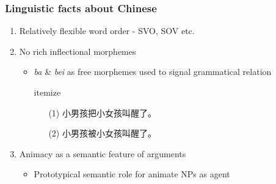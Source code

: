 \documentclass{beamer}
\begin{document}



\begin{frame}
\frametitle{Linguistic facts about Chinese}

\begin{enumerate}
    \pause
   \item Relatively flexible word order - SVO, SOV etc.
   \pause
   \setlength{\parskip}{1em}
   \pause
   \item No rich inflectional morphemes
   \pause
   \begin{itemize}
    \pause
       \item \emph{ba} \& \emph{bei} as free morphemes used to signal grammatical relation
       \vspace{2mm}
       \begin{CJK*}{UTF8}{gbsn}itemize
       
       \begin{itemize}
           \centering
           \item[(1)] 小男孩把小女孩叫醒了。
           \vspace{1mm}
           \item[(2)] 小男孩被小女孩叫醒了。
       \end{itemize}
    
       
       \end{CJK*}
       \pause
   \end{itemize}
   \setlength{\parskip}{1em}
   \pause
   \item Animacy as a semantic feature of arguments
   \pause
    \begin{itemize}
    \pause
    \item Prototypical semantic role for animate NPs as agent
    \pause
   \end{itemize}
\end{enumerate}
\end{frame}




\end{document}
